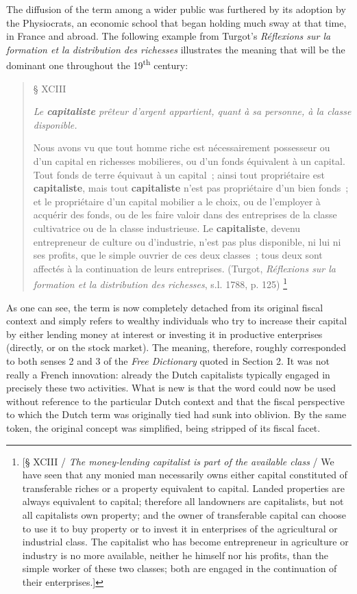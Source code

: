 \documentclass[output=paper]{langsci/langscibook}
\begin{document}
The diffusion of the term among a wider public was furthered by its
adoption by the Physiocrats, an economic school that began holding much
sway at that time, in France and abroad. The following example from
Turgot's \emph{Réflexions sur la formation et la distribution des
richesses} illustrates the meaning that will be the
dominant one throughout the 19\textsuperscript{th} century:

\begin{quote}
§ XCIII

\emph{Le \textbf{capitaliste} prêteur d'argent appartient, quant à sa
personne, à la classe disponible.}

Nous avons vu que tout homme riche est nécessairement possesseur ou d'un
capital en richesses mobilieres, ou d'un fonds équivalent à un capital.
Tout fonds de terre équivaut à un capital~; ainsi tout propriétaire est
\textbf{capitaliste}, mais tout \textbf{capitaliste} n'est pas
propriétaire d'un bien fonds~; et le propriétaire d'un capital mobilier
a le choix, ou de l'employer à acquérir des fonds, ou de les faire
valoir dans des entreprises de la classe cultivatrice ou de la classe
industrieuse. Le \textbf{capitaliste}, devenu entrepreneur de culture ou
d'industrie, n'est pas plus disponible, ni lui ni ses profits, que le
simple ouvrier de ces deux classes~; tous deux sont affectés à la
continuation de leurs entreprises.
  (Turgot, \emph{Réflexions sur la formation et la distribution des
richesses}, s.l. 1788, p. 125)%
\footnote{{[}§ XCIII / \emph{The
  money-lending capitalist is part of the available class} / We have
  seen that any monied man necessarily owns either capital constituted
  of transferable riches or a property equivalent to capital. Landed
  properties are always equivalent to capital; therefore all land\-owners
  are capitalists, but not all capitalists own property; and the owner
  of transferable capital can choose to use it to buy property or to
  invest it in enterprises of the agricultural or industrial class. The
  capitalist who has become entrepreneur in agriculture or industry is
  no more available, neither he himself nor his profits, than the simple
  worker of these two classes; both are engaged in the continuation of
  their enterprises.{]}}
\end{quote}

As one can see, the term is now completely detached from its original
fiscal context and simply refers to wealthy individuals who try to
increase their capital by either lending money at interest or investing
it in productive enterprises (directly, or on the stock market). The
meaning, therefore, roughly corresponded to both  senses 2 and 3 of
the \emph{Free Dictionary} quoted in Section 2. It was not really a
French innovation: already the Dutch capitalists typically engaged in
precisely these two activities. What is new is that the word could now
be used without reference to the particular Dutch context and that the
fiscal perspective to which the Dutch term was originally tied had sunk
into oblivion. By the same token, the original concept was simplified,
being stripped of its fiscal facet.
\end{document}
